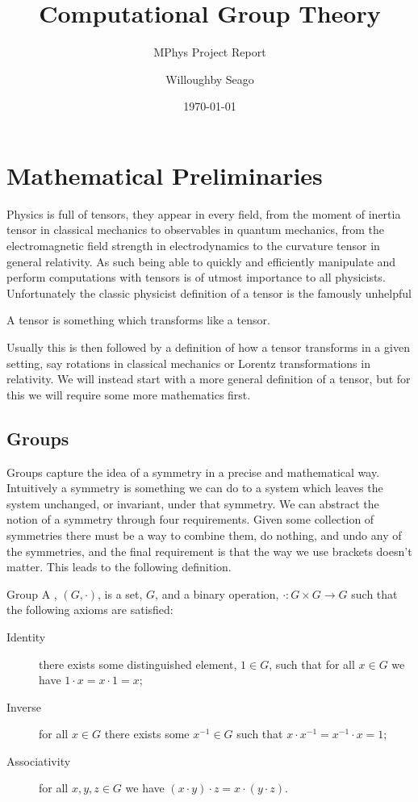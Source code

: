 \documentclass[fleqn]{NotesClass}
\title{Computational Group Theory}
\author{Willoughby Seago}
\date{\today}
\subtitle{MPhys Project Report}
\newcommand{\identity}{1}
\begin{document}
    \frontmatter
    \titlepage
    \maketitle
    \tableofcontents
    \mainmatter
    
    \chapter{Mathematical Preliminaries}
    Physics is full of tensors, they appear in every field, from the moment of inertia tensor in classical mechanics to observables in quantum mechanics, from the electromagnetic field strength in electrodynamics to the curvature tensor in general relativity.
    As such being able to quickly and efficiently manipulate and perform computations with tensors is of utmost importance to all physicists.
    Unfortunately the classic physicist definition of a tensor is the famously unhelpful
    \begin{displayquote}
        A tensor is something which transforms like a tensor.
    \end{displayquote}
    Usually this is then followed by a definition of how a tensor transforms in a given setting, say rotations in classical mechanics or Lorentz transformations in relativity.
    We will instead start with a more general definition of a tensor, but for this we will require some more mathematics first.
    
    
    \section{Groups}
    Groups capture the idea of a symmetry in a precise and mathematical way.
    Intuitively a symmetry is something we can do to a system which leaves the system unchanged, or invariant, under that symmetry.
    We can abstract the notion of a symmetry through four requirements.
    Given some collection of symmetries there must be a way to combine them, do nothing, and undo any of the symmetries, and the final requirement is that the way we use brackets doesn't matter.
    This leads to the following definition.
    
    \begin{dfn}{Group}{}
        A , \((G, \cdot)\), is a set, \(G\), and a binary operation, \(\cdot \colon G \times G \to G\) such that the following axioms are satisfied:
        \begin{description}
            \item[Identity] there exists some distinguished element, \(\identity \in G\), such that for all \(x \in G\) we have \(\identity \cdot x = x \cdot \identity = x\);
            \item[Inverse] for all \(x \in G\) there exists some \(x^{-1} \in G\) such that \(x \cdot x^{-1} = x^{-1} \cdot x = \identity\);
            \item[Associativity] for all \(x, y, z \in G\) we have \((x \cdot y) \cdot z = x \cdot (y \cdot z)\).
        \end{description}
    \end{dfn}
    
\end{document}

